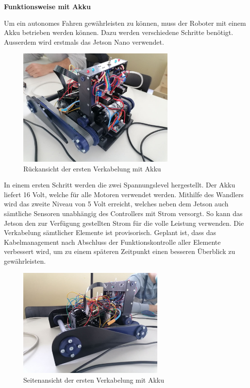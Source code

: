 \newpage

\textbf{Funktionsweise mit Akku}\label{sec:Funktionsweisemit Akku}

Um ein autonomes Fahren gewährleisten zu können, muss der Roboter mit einem Akku betrieben werden können. Dazu werden verschiedene Schritte benötigt. Ausserdem wird erstmals das Jetson Nano verwendet.

\begin{figure}[H]
\includegraphics[width=0.7\textwidth]{img/Sprint3/Sprint3_Verkabelung1.jpg}
\centering
\caption{Rückansicht der ersten Verkabelung mit Akku} \label{fig:Rückansicht der ersten Verkabelung}
\end{figure}
  
  
In einem ersten Schritt werden die zwei Spannungslevel hergestellt. Der Akku liefert 16 Volt, welche für alle Motoren verwendet werden. Mithilfe des Wandlers wird das zweite Niveau von 5 Volt erreicht, welches neben dem Jetson auch sämtliche Sensoren unabhängig des Controllers mit Strom versorgt. So kann das Jetson den zur Verfügung gestellten Strom für die volle Leistung verwenden.
Die Verkabelung sämtlicher Elemente ist provisorisch. Geplant ist, dass das Kabelmanagement nach Abschluss der Funktionskontrolle aller Elemente verbessert wird, um zu einem späteren Zeitpunkt einen besseren Überblick zu gewährleisten.
  
\begin{figure}[H]
\includegraphics[width=0.65\textwidth]{img/Sprint3/Sprint3_Verkabelung2.jpg}
\centering
\caption{Seitenansicht der ersten Verkabelung mit Akku}
\label{fig:Seitenansicht der ersten Verkabelung}
\end{figure}
  
